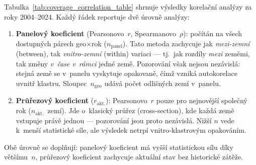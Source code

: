 Tabulka~\ref{tab:coverage_correlation_table} shrnuje výsledky korelační analýzy za roky 2004--2024.
Každý řádek reportuje dvě úrovně analýzy:
\begin{enumerate}
  \item \textbf{Panelový koeficient} (Pearsonovo~$r$, Spearmanovo~$\rho$): počítán na všech dostupných párech geo$\times$rok ($n_{\text{panel}}$).
    Tato metoda zachycuje jak \emph{mezi-zemní} (between), tak \emph{vnitro-zemní} (within) variaci --- tj.\ jak rozdíly \emph{mezi} zeměmi, tak změny \emph{v~čase v~rámci} jedné země.
    Pozorování však nejsou nezávislá: stejná země se v~panelu vyskytuje opakovaně, čímž vzniká autokorelace uvnitř klastru.
    Sloupec~$n_{\text{geo}}$ udává počet odlišných zemí v~panelu.
  \item \textbf{Průřezový koeficient} ($r_{\text{akt.}}$): Pearsonovo~$r$ pouze pro nejnovější společný rok ($n_{\text{akt.}}$~zemí).
    Jde o~klasický průřez (cross-section), kde každá země vstupuje právě jednou --- pozorování jsou proto nezávislá.
    Nižší $n$ vede k~menší statistické síle, ale výsledek netrpí vnitro-klastrovým opakováním.
\end{enumerate}
Obě úrovně se doplňují: panelový koeficient má vyšší statistickou sílu díky většímu~$n$, průřezový koeficient zachycuje aktuální stav bez historické zátěže.



